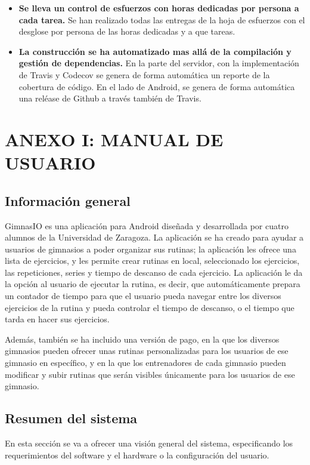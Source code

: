 \documentclass[11pt,a4paper]{report}
\begin{document}
\begin{itemize}
	\item \textbf{Se lleva un control de esfuerzos con horas dedicadas por persona a cada tarea.} Se han realizado todas las entregas de la hoja de esfuerzos con el desglose por persona de las horas dedicadas y a que tareas.

	\item \textbf{La construcción se ha automatizado mas allá de la compilación y gestión de dependencias.} En la parte del servidor, con la implementación de Travis y Codecov se genera de forma automática un reporte de la cobertura de código. En el lado de Android, se genera de forma automática una reléase de Github a través también de Travis.

\end{itemize}
\chapter{ANEXO I: MANUAL DE USUARIO}
\section{Información general}
GimnasIO es una aplicación para Android diseñada y desarrollada por cuatro alumnos de la Universidad de Zaragoza. La aplicación se ha creado para ayudar a usuarios de gimnasios a poder organizar sus rutinas; la aplicación les ofrece una lista de ejercicios, y les permite crear rutinas en local, seleccionado los ejercicios, las repeticiones, series y tiempo de descanso de cada ejercicio. La aplicación le da la opción al usuario de ejecutar la rutina, es decir, que automáticamente prepara un contador de tiempo para que el usuario pueda navegar entre los diversos ejercicios de la rutina y pueda controlar el tiempo de descanso, o el tiempo que tarda en hacer sus ejercicios.

Además, también se ha incluido una versión de pago, en la que los diversos gimnasios pueden ofrecer unas rutinas personalizadas para los usuarios de ese gimnasio en específico, y en la que los entrenadores de cada gimnasio pueden modificar y subir rutinas que serán visibles únicamente para los usuarios de ese gimnasio.

\section{Resumen del sistema}
En esta sección se va a ofrecer una visión general del sistema, especificando los requerimientos del   software y el hardware o la configuración del usuario.
\end{document}
